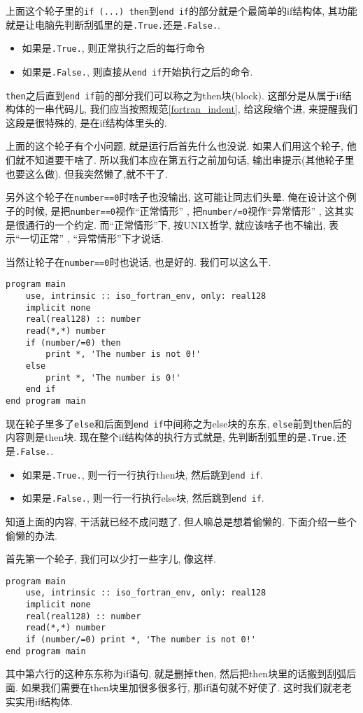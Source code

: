 上面这个轮子里的\texttt{if (...) then}到\texttt{end if}的部分就是个最简单的if结构体, 其功能就是让电脑先判断刮弧里的是\texttt{.True.}还是\texttt{.False.}.
\begin{itemize}
    \item 如果是\texttt{.True.}, 则正常执行之后的每行命令
    \item 如果是\texttt{.False.}, 则直接从\texttt{end if}开始执行之后的命令.
\end{itemize}

\texttt{then}之后直到\texttt{end if}前的部分我们可以称之为then块(block). 这部分是从属于if结构体的一串代码儿, 我们应当按照规范\ref{fortran_indent}, 给这段缩个进, 来提醒我们这段是很特殊的, 是在if结构体里头的.

上面的这个轮子有个小问题, 就是运行后首先什么也没说. 如果人们用这个轮子, 他们就不知道要干啥了. 所以我们本应在第五行之前加句话, 输出串提示(其他轮子里也要这么做). 但我突然懒了,就不干了.

另外这个轮子在\texttt{number==0}时啥子也没输出, 这可能让同志们头晕. 俺在设计这个例子的时候, 是把\texttt{number==0}视作``正常情形'' , 把\texttt{number/=0}视作``异常情形'' , 这其实是很通行的一个约定. 而``正常情形''下, 按UNIX哲学, 就应该啥子也不输出, 表示``一切正常'' , ``异常情形''下才说话.

当然让轮子在\texttt{number==0}时也说话, 也是好的. 我们可以这么干.\newpage
\begin{lstlisting}
program main
    use, intrinsic :: iso_fortran_env, only: real128
    implicit none
    real(real128) :: number
    read(*,*) number
    if (number/=0) then
        print *, 'The number is not 0!'
    else
        print *, 'The number is 0!'
    end if
end program main
\end{lstlisting}
现在轮子里多了\texttt{else}和后面到\texttt{end if}中间称之为else块的东东, \texttt{else}前到\texttt{then}后的内容则是then块. 现在整个if结构体的执行方式就是, 先判断刮弧里的是\texttt{.True.}还是\texttt{.False.}.
\begin{itemize}
    \item 如果是\texttt{.True.}, 则一行一行执行then块, 然后跳到\texttt{end if}.
    \item 如果是\texttt{.False.},  则一行一行执行else块, 然后跳到\texttt{end if}.
\end{itemize}

知道上面的内容, 干活就已经不成问题了. 但人嘛总是想着偷懒的. 下面介绍一些个偷懒的办法.

首先第一个轮子, 我们可以少打一些字儿, 像这样.
\begin{lstlisting}
program main
    use, intrinsic :: iso_fortran_env, only: real128
    implicit none
    real(real128) :: number
    read(*,*) number
    if (number/=0) print *, 'The number is not 0!'
end program main
\end{lstlisting}
其中第六行的这种东东称为if语句, 就是删掉\texttt{then}, 然后把then块里的话搬到刮弧后面. 如果我们需要在then块里加很多很多行, 那if语句就不好使了. 这时我们就老老实实用if结构体.

